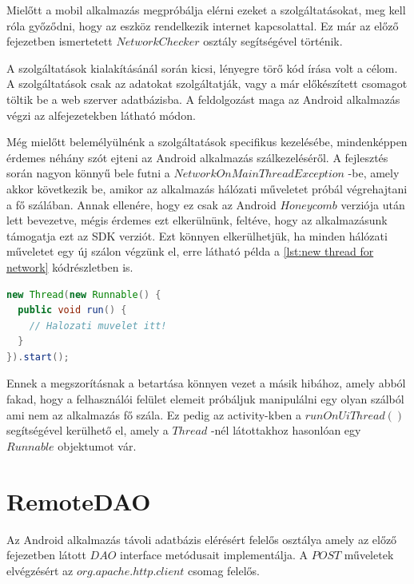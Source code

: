 \documentclass[12pt]{report}
\theoremstyle{definition}
\begin{document}
	Mielőtt a mobil alkalmazás megpróbálja elérni ezeket a szolgáltatásokat, meg kell róla győződni, hogy az eszköz rendelkezik internet kapcsolattal. Ez már az előző fejezetben ismertetett $NetworkChecker$ osztály segítségével történik.
	
	A szolgáltatások kialakításánál során kicsi, lényegre törő kód írása volt a célom. A szolgáltatások csak az adatokat szolgáltatják, vagy a már előkészített csomagot töltik be a web szerver adatbázisba. A feldolgozást maga az Android alkalmazás végzi az alfejezetekben látható módon.
	
	Még mielőtt belemélyülnénk a szolgáltatások specifikus kezelésébe, mindenképpen érdemes néhány szót ejteni az Android alkalmazás szálkezeléséről. A fejlesztés során nagyon könnyű bele futni a $NetworkOnMainThreadException$ -be, amely akkor következik be, amikor az alkalmazás hálózati műveletet próbál végrehajtani a fő szálában. Annak ellenére, hogy ez csak az Android $Honeycomb$ verziója után lett bevezetve, mégis érdemes ezt elkerülnünk, feltéve, hogy az alkalmazásunk támogatja ezt az SDK verziót. Ezt könnyen elkerülhetjük, ha minden hálózati műveletet egy új szálon végzünk el, erre látható példa a \ref{lst:new thread for network} kódrészletben is.
	
	\noindent\begin{minipage}{\linewidth}
		\begin{lstlisting}[language=java,label={lst:new thread for network}, caption={Új szál létrehozásra}]
new Thread(new Runnable() {
  public void run() {
    // Halozati muvelet itt!
  }
}).start();
		\end{lstlisting}
	\end{minipage}
	
	Ennek a megszorításnak a betartása könnyen vezet a másik hibához, amely abból fakad, hogy a felhasználói felület elemeit próbáljuk manipulálni egy olyan szálból ami nem az alkalmazás fő szála. Ez pedig az activity-kben a  $runOnUiThread\left(\right)$ segítségével kerülhető el, amely a $Thread$ -nél látottakhoz hasonlóan egy $Runnable$ objektumot vár.
	
	\section{RemoteDAO}
	Az Android alkalmazás távoli adatbázis elérésért felelős osztálya amely az előző fejezetben látott $DAO$ interface metódusait implementálja. A $POST$ műveletek elvégzésért az $org.apache.http.client$ csomag felelős.
	
\end{document}
